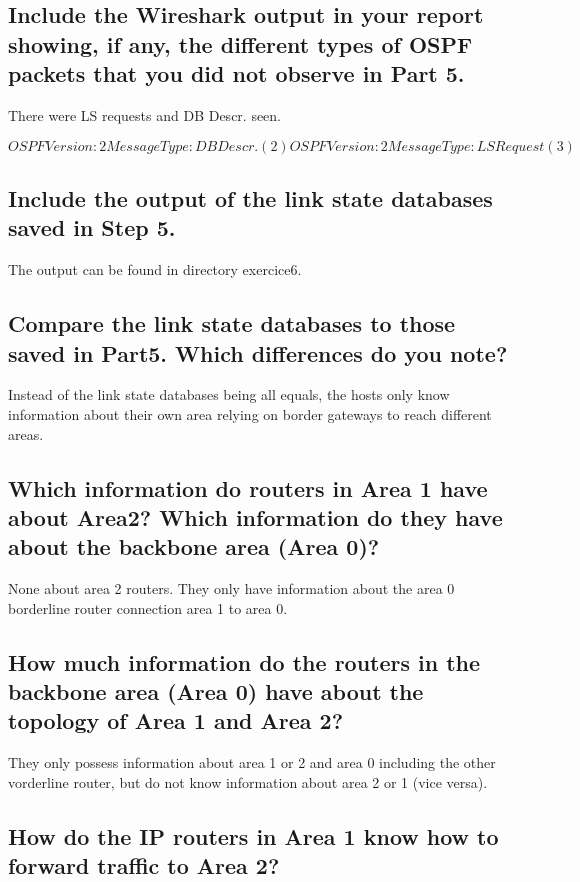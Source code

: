 \documentclass[a4paper, 11pt]{article}
\begin{document}
\subsection{Include the Wireshark output in your report showing, if any, the different types of OSPF packets that you did not observe in Part 5. }

There were LS requests and DB Descr. seen.

$OSPF Version: 2
        Message Type: DB Descr. (2)
OSPF Version: 2
Message Type: LS Request (3)$

\subsection{Include the output of the link state databases saved in Step 5. }

The output can be found in directory exercice6.


\subsection{Compare the link state databases to those saved in Part5. Which differences do you note?  }

Instead of the link state databases being all equals, the hosts only know information about their own area relying on border gateways to reach different areas.

\subsection{Which information do routers in Area 1 have about Area2? Which information do they have about the backbone area (Area 0)?  }

None about area 2 routers. They only have information about the area 0 borderline router connection area 1 to area 0.

\subsection{How much information do the routers in the backbone area (Area 0) have about the topology of Area 1 and Area 2?  }

They only possess information about area 1 or 2 and area 0 including the other vorderline router, but do not know information about area 2 or 1 (vice versa).

\subsection{How do the IP routers in Area 1 know how to forward traffic to Area 2?  }
\end{document}
